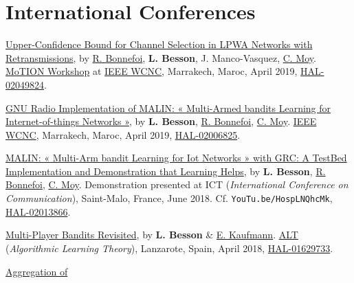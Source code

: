 \section*{International Conferences}
\renewcommand{\labelenumi}{[IC-\arabic{enumi}]}
\begin{etaremune}
\item
	\href{https://perso.crans.org/besson/articles/BMBBM__IEEE_WCNC__2019.pdf}{Upper-Confidence
	Bound for Channel Selection in LPWA Networks with Retransmissions},
	by \href{https://remibonnefoi.wordpress.com/}{R. Bonnefoi}, \textbf{L. Besson}, J.
	Manco-Vasquez,
  \href{https://moychris.wordpress.com/}{C. Moy}.
  \href{https://sites.google.com/view/wcncworkshop-motion2019/}{MoTION Workshop} at
  \href{http://wcnc2019.ieee-wcnc.org/}{IEEE WCNC},
  Marrakech, Maroc, April 2019, \href{https://hal.inria.fr/hal-02049824}{HAL-02049824}.
  \cite{Bonnefoi2019WCNC}
\item
  \href{https://perso.crans.org/besson/articles/BBM__IEEE_WCNC_2019.pdf}{GNU
  Radio Implementation of MALIN: « Multi-Armed bandits Learning for
  Internet-of-things Networks »}, by \textbf{L. Besson},
  \href{https://remibonnefoi.wordpress.com/}{R. Bonnefoi},
  \href{https://moychris.wordpress.com/}{C. Moy}.
  \href{http://wcnc2019.ieee-wcnc.org/}{IEEE WCNC},
  Marrakech, Maroc, April 2019, \href{https://hal.inria.fr/hal-02006825}{HAL-02006825}.
  \cite{Besson2019WCNC}
\item
  \href{https://perso.crans.org/besson/articles/BBM__Demo_ICT_2018.pdf}{MALIN:
  « Multi-Arm bandit Learning for Iot Networks » with GRC: A TestBed
  Implementation and Demonstration that Learning Helps}, by \textbf{L.
  Besson}, \href{https://remibonnefoi.wordpress.com/}{R. Bonnefoi},
  \href{https://moychris.wordpress.com/}{C. Moy}. Demonstration
  presented at ICT (\emph{International Conference on Communication}),
  Saint-Malo, France, June 2018. Cf. \texttt{YouTu.be/HospLNQhcMk}, \href{https://hal.inria.fr/hal-02013866}{HAL-02013866}.
  \cite{Besson2018ICT}
\item
  \href{https://hal.inria.fr/hal-01629733/document}{Multi-Player Bandits
  Revisited}, by \textbf{L. Besson} \&
  \href{http://chercheurs.lille.inria.fr/ekaufman/research.html}{E.
  Kaufmann}.
  \href{http://www.cs.cornell.edu/conferences/alt2018/accepted.html}{ALT}
  (\emph{Algorithmic Learning Theory}), Lanzarote, Spain, April 2018,
  \href{https://hal.inria.fr/hal-01629733}{HAL-01629733}.
  \cite{Besson2018ALT}
\item
  \href{https://hal.inria.fr/hal-01705292/document}{Aggregation of
}
\end{etaremune}
